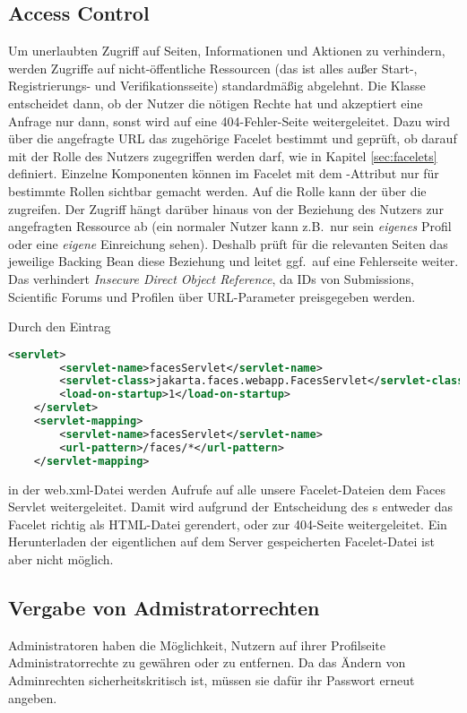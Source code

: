 \subsection{Access Control}\label{subsec:access-control}
Um unerlaubten Zugriff auf Seiten, Informationen und Aktionen zu verhindern, werden Zugriffe auf nicht-öffentliche Ressourcen (das ist alles außer Start-, Registrierungs- und Verifikationsseite) standardmäßig abgelehnt.
Die Klasse  entscheidet dann, ob der Nutzer die nötigen Rechte hat und akzeptiert eine Anfrage nur dann, sonst wird auf eine 404-Fehler-Seite weitergeleitet.
Dazu wird über die angefragte URL das zugehörige Facelet bestimmt und geprüft, ob darauf mit der Rolle des Nutzers zugegriffen werden darf, wie in Kapitel \ref{sec:facelets} definiert.
Einzelne Komponenten können im Facelet mit dem -Attribut nur für bestimmte Rollen sichtbar gemacht werden.
Auf die Rolle kann der  über die  zugreifen.
Der Zugriff hängt darüber hinaus von der Beziehung des Nutzers zur angefragten Ressource ab (ein normaler Nutzer kann z.B.\ nur sein \emph{eigenes} Profil oder eine \emph{eigene} Einreichung sehen).
Deshalb prüft für die relevanten Seiten das jeweilige Backing Bean diese Beziehung und leitet ggf.\ auf eine Fehlerseite weiter.
Das verhindert \emph{Insecure Direct Object Reference}, da IDs von Submissions, Scientific Forums und Profilen über URL-Parameter preisgegeben werden.

Durch den Eintrag
\begin{lstlisting}[language=XML]
    <servlet>
        <servlet-name>facesServlet</servlet-name>
        <servlet-class>jakarta.faces.webapp.FacesServlet</servlet-class>
        <load-on-startup>1</load-on-startup>
    </servlet>
    <servlet-mapping>
        <servlet-name>facesServlet</servlet-name>
        <url-pattern>/faces/*</url-pattern>
    </servlet-mapping>
\end{lstlisting}
in der web.xml-Datei werden Aufrufe auf alle unsere Facelet-Dateien dem Faces Servlet weitergeleitet.
Damit wird aufgrund der Entscheidung des s entweder das Facelet richtig als HTML-Datei gerendert, oder zur 404-Seite weitergeleitet. Ein Herunterladen der eigentlichen auf dem Server gespeicherten Facelet-Datei ist aber nicht möglich.

\subsection{Vergabe von Admistratorrechten}
Administratoren haben die Möglichkeit, Nutzern auf ihrer Profilseite Administratorrechte zu gewähren oder zu entfernen.
Da das Ändern von Adminrechten sicherheitskritisch ist, müssen sie dafür ihr Passwort erneut angeben.
